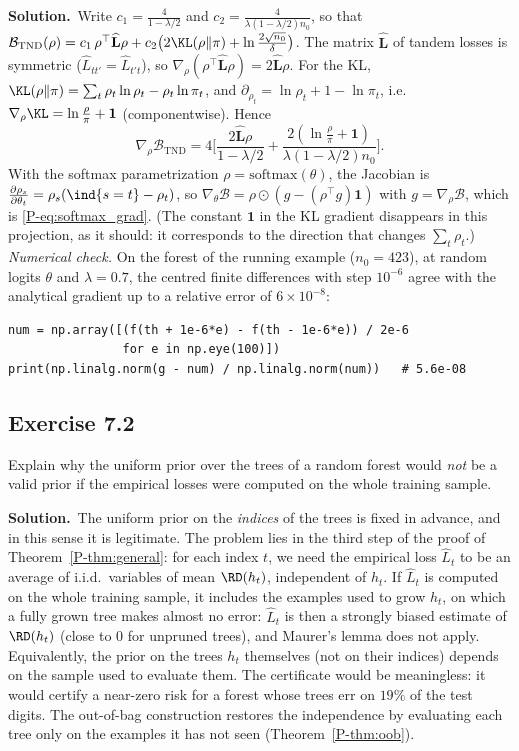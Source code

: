 \documentclass[11pt]{article}
\newcommand{\statement}[1]{\begin{tcolorbox}[enhanced,breakable,colback=black!3,colframe=black!25,boxrule=0.4pt,sharp corners,fontupper=\itshape\small]#1\end{tcolorbox}}
\newcommand{\exo}[1]{\Needspace{6\baselineskip}\subsection*{Exercise #1}\addcontentsline{toc}{subsection}{Exercise #1}}
\newcommand{\sol}{\noindent\textbf{Solution.}\ }
\begin{document}
\sol Write $c_1=\frac{4}{1-\lambda/2}$ and $c_2=\frac{4}{\lambda(1-\lambda/2)n_0}$, so that
$\mathcal B_{\mathrm{TND}}(\rho)=c_1\,\rho^\top\widehat{\mathbf L}\rho+c_2\big(2\KL(\rho\|\pi)+\ln\frac{2\sqrt{n_0}}\delta\big)$. The matrix $\widehat{\mathbf L}$ of
tandem losses is symmetric ($\widehat L_{tt'}=\widehat L_{t't}$), so $\nabla_\rho(\rho^\top\widehat{\mathbf L}\rho)=2\widehat{\mathbf L}\rho$. For the KL,
$\KL(\rho\|\pi)=\sum_t\rho_t\ln\rho_t-\rho_t\ln\pi_t$, and $\partial_{\rho_t}=\ln\rho_t+1-\ln\pi_t$, i.e.\
$\nabla_\rho\KL=\ln\frac\rho\pi+\mathbf1$ (componentwise). Hence
\[
\nabla_\rho\mathcal B_{\mathrm{TND}}=4\Big[\frac{2\widehat{\mathbf L}\rho}{1-\lambda/2}+\frac{2(\ln\frac\rho\pi+\mathbf 1)}{\lambda(1-\lambda/2)n_0}\Big].
\]
With the softmax parametrization $\rho=\mathrm{softmax}(\theta)$, the Jacobian is $\frac{\partial\rho_s}{\partial\theta_t}=\rho_s(\ind{s=t}-\rho_t)$,
so $\nabla_\theta\mathcal B=\rho\odot(g-(\rho^\top g)\mathbf 1)$ with $g=\nabla_\rho\mathcal B$, which is \eqref{P-eq:softmax_grad}. (The constant $\mathbf1$
in the KL gradient disappears in this projection, as it should: it corresponds to the direction that changes
$\sum_t\rho_t$.) \emph{Numerical check.} On the forest of the running example ($n_0=423$), at random logits $\theta$ and
$\lambda=0.7$, the centred finite differences with step $10^{-6}$ agree with the analytical gradient up to a relative error
of $6\times10^{-8}$:
\begin{verbatim}
num = np.array([(f(th + 1e-6*e) - f(th - 1e-6*e)) / 2e-6
                for e in np.eye(100)])
print(np.linalg.norm(g - num) / np.linalg.norm(num))   # 5.6e-08
\end{verbatim}

\exo{7.2}
\statement{Explain why the uniform prior over the trees of a random forest would \emph{not} be a valid prior if the empirical
losses were computed on the whole training sample.}

\sol The uniform prior on the \emph{indices} of the trees is fixed in advance, and in this sense it is legitimate.
The problem lies in the third step of the proof of Theorem~\ref{P-thm:general}: for each index $t$, we need the empirical loss
$\widehat L_t$ to be an average of i.i.d.\ variables of mean $\RD(h_t)$, independent of $h_t$. If $\widehat L_t$ is computed on the whole
training sample, it includes the examples used to grow $h_t$, on which a fully grown tree makes almost no error: $\widehat L_t$ is
then a strongly biased estimate of $\RD(h_t)$ (close to $0$ for unpruned trees), and Maurer's lemma does not apply.
Equivalently, the prior on the trees $h_t$ themselves (not on their indices) depends on the sample used to evaluate
them. The certificate would be meaningless: it would certify a near-zero risk for a forest whose trees err on $19\%$ of
the test digits. The out-of-bag construction restores the independence by evaluating each tree only on the examples
it has not seen (Theorem~\ref{P-thm:oob}).
\end{document}
